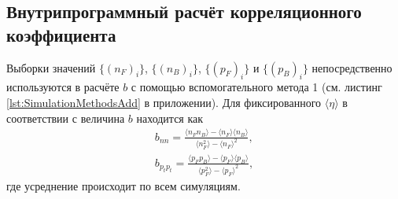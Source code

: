 \subsection{Внутрипрограммный расчёт корреляционного коэффициента}
Выборки значений $\{ (n_F)_i \}$, $\{ (n_B)_i \}$, $\{ (p_F)_i \}$ и $\{ (p_B)_i \}$ непосредственно используются в расчёте $b$ с помощью вспомогательного метода 1 (см. листинг \ref{lst:SimulationMethodsAdd} в приложении). Для фиксированного $\langle \eta \rangle$ в соответствии с \cite{bStatement} величина $b$ находится как 
\begin{equation} \label{eq:nfnb}
\begin{split}
	b_{nn} = \frac{\langle n_F n_B \rangle - \langle n_F \rangle \langle n_B \rangle}{\langle n_F^2 \rangle - \langle n_F \rangle^2}, \\
	b_{p_tp_t} = \frac{\langle p_F p_B \rangle - \langle p_F \rangle \langle p_B \rangle}{\langle p_F^2 \rangle - \langle p_F \rangle^2},
\end{split}
\end{equation}
где усреднение происходит по всем симуляциям. 

